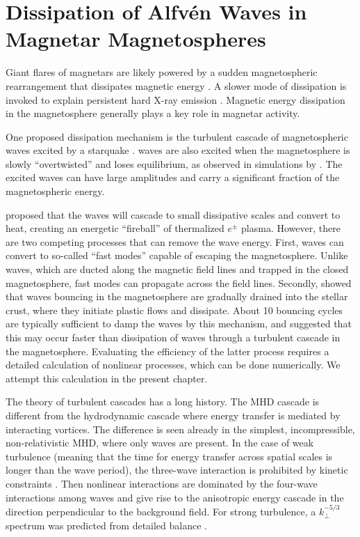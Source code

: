 
\chapter[Dissipation of Alfv\'{e}n Waves in Magnetar Magnetospheres]{Dissipation of Alfv\'{e}n Waves in Magnetar Magnetospheres}
\label{chap:magnetosphere-dissipation}

Giant flares of magnetars are likely powered by a sudden magnetospheric rearrangement that dissipates magnetic energy \citep{1995MNRAS.275..255T,1996ApJ...473..322T,2001ApJ...561..980T}.
A slower mode of dissipation is invoked to explain persistent hard X-ray emission \citep{2013ApJ...762...13B}.
Magnetic energy dissipation in the magnetosphere generally plays a key role in magnetar activity.

One proposed dissipation mechanism is the turbulent cascade of magnetospheric \alfven waves excited by a starquake \citep{1996ApJ...473..322T}. \alfven waves are also excited when the magnetosphere is slowly ``overtwisted'' and loses equilibrium, as observed in simulations by \citep{2013ApJ...774...92P}. The excited waves can have large amplitudes and carry a significant fraction of the magnetospheric energy. 

\citet{1996ApJ...473..322T,2001ApJ...561..980T} proposed that the waves will cascade to small dissipative scales and convert to heat, creating an energetic ``fireball'' of thermalized $e^\pm$ plasma. However, there are two competing processes that can remove the wave energy. First, \alfven waves can convert to so-called ``fast modes'' capable of escaping the magnetosphere. Unlike \alfven waves, which are ducted along the magnetic field lines and trapped in the closed magnetosphere, fast modes can propagate across the field lines.
Secondly, \citet{2015ApJ...815...25L} showed that \alfven waves bouncing in the magnetosphere are gradually drained into the stellar crust, where they initiate plastic flows and dissipate. About 10 bouncing cycles are typically sufficient to damp the waves by this mechanism, and \citet{2015ApJ...815...25L} suggested that this may occur faster than dissipation of waves through a turbulent cascade in the magnetosphere. Evaluating the efficiency of the latter process requires a detailed calculation of nonlinear processes, which can be done numerically. We attempt this calculation in the present chapter.

The theory of turbulent cascades has a long history. The MHD cascade is different from the hydrodynamic cascade where energy transfer is mediated by interacting vortices. The difference is seen already in the simplest, incompressible, non-relativistic MHD, where only \alfven waves are present. In the case of weak turbulence (meaning that the time for energy transfer across spatial scales is longer than the wave period),
the three-wave interaction is prohibited by kinetic constraints \citep{1994ApJ...432..612S}. 
Then nonlinear interactions are dominated by the four-wave interactions among \alfven waves and give rise to the anisotropic energy cascade in the direction perpendicular to the background field. For strong turbulence, a $k_\perp^{-5/3}$ spectrum was predicted from detailed balance \citep{1995ApJ...438..763G}.

